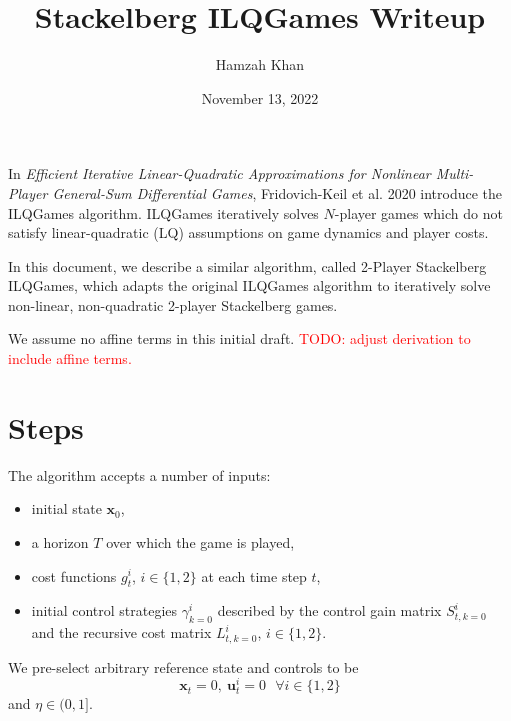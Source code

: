 \documentclass[11pt]{article}
\title{Stackelberg ILQGames Writeup}
\author{Hamzah Khan} \date{November 13, 2022}
\newcommand\truestate[1]{\bm{x}_{#1}}
\newcommand\ctrl[2]{\bm{u}^{#1}_{#2}}
\newcommand\horizon{T}
\newcommand\todo[1]{\textcolor{red}{TODO: #1}}
\begin{document}
\maketitle

In \emph{Efficient Iterative Linear-Quadratic Approximations for Nonlinear Multi-Player General-Sum Differential Games}, Fridovich-Keil et al. 2020 introduce the ILQGames algorithm. ILQGames iteratively solves $N$-player games which do not satisfy linear-quadratic (LQ) assumptions on game dynamics and player costs.

In this document, we describe a similar algorithm, called 2-Player Stackelberg ILQGames, which adapts the original ILQGames algorithm to iteratively solve non-linear, non-quadratic 2-player Stackelberg games.

We assume no affine terms in this initial draft. \todo{adjust derivation to include affine terms.}

\section{Steps}
The algorithm accepts a number of inputs:
\begin{itemize}
\item initial state $\truestate{0}$,
\item a horizon $\horizon$ over which the game is played,
\item cost functions $g^i_t$, $i \in \{1, 2\}$ at each time step $t$,
\item initial control strategies $\gamma^i_{k=0}$ described by the control gain matrix $S^i_{t, k=0}$ and the recursive cost matrix $L^i_{t, k=0}$, $i \in \{1, 2\}$.
\end{itemize}

We pre-select arbitrary reference state and controls to be
\[ \truestate{t} = 0, ~ \ctrl{i}{t} = 0 ~~~ \forall i \in \{ 1, 2 \} \]
and $\eta \in (0, 1]$.
\end{document}
